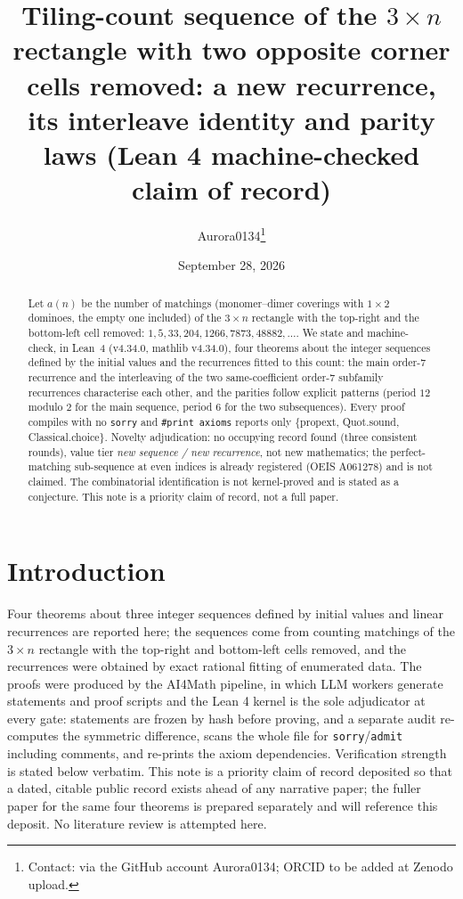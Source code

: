 \documentclass[11pt]{article}
\title{Tiling-count sequence of the $3\times n$ rectangle with two opposite
corner cells removed: a new recurrence, its interleave identity and parity laws
(Lean 4 machine-checked claim of record)}
\author{Aurora0134\thanks{Contact: via the GitHub account Aurora0134; ORCID to
be added at Zenodo upload.}}
\date{September 28, 2026}
\theoremstyle{definition}
\begin{document}
\maketitle

\begin{abstract}
Let $a(n)$ be the number of matchings (monomer--dimer coverings with
$1\times 2$ dominoes, the empty one included) of the $3\times n$ rectangle
with the top-right and the bottom-left cell removed:
$1,5,33,204,1266,7873,48882,\dots$. We state and machine-check, in Lean~4
(v4.34.0, mathlib v4.34.0), four theorems about the integer sequences defined
by the initial values and the recurrences fitted to this count: the main
order-$7$ recurrence and the interleaving of the two same-coefficient order-$7$
subfamily recurrences characterise each other, and the parities follow explicit
patterns (period $12$ modulo $2$ for the main sequence, period $6$ for the two
subsequences). Every proof compiles with no \texttt{sorry} and
\texttt{\#print axioms} reports only \{propext, Quot.sound,
Classical.choice\}. Novelty adjudication: no occupying record found (three
consistent rounds), value tier \emph{new sequence / new recurrence}, not new
mathematics; the perfect-matching sub-sequence at even indices is already
registered (OEIS A061278) and is not claimed. The combinatorial identification
is not kernel-proved and is stated as a conjecture. This note is a priority
claim of record, not a full paper.
\end{abstract}

\section{Introduction}

Four theorems about three integer sequences defined by initial values and
linear recurrences are reported here; the sequences come from counting
matchings of the $3\times n$ rectangle with the top-right and bottom-left cells
removed, and the recurrences were obtained by exact rational fitting of
enumerated data. The proofs were produced by the AI4Math pipeline, in which LLM
workers generate statements and proof scripts and the Lean 4 kernel is the sole
adjudicator at every gate: statements are frozen by hash before proving, and a
separate audit re-computes the symmetric difference, scans the whole file for
\texttt{sorry}/\texttt{admit} including comments, and re-prints the axiom
dependencies. Verification strength is stated below verbatim. This note is a
priority claim of record deposited so that a dated, citable public record
exists ahead of any narrative paper; the fuller paper for the same four
theorems is prepared separately and will reference this deposit. No literature
review is attempted here.
\end{document}
